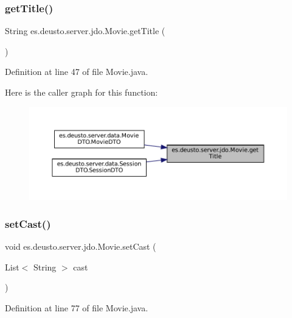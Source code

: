 \subsubsection{\texorpdfstring{getTitle()}{getTitle()}}
{\footnotesize\ttfamily String es.\+deusto.\+server.\+jdo.\+Movie.\+get\+Title (\begin{DoxyParamCaption}{ }\end{DoxyParamCaption})}



Definition at line 47 of file Movie.\+java.

Here is the caller graph for this function\+:\nopagebreak
\begin{figure}[H]
\begin{center}
\leavevmode
\includegraphics[width=350pt]{classes_1_1deusto_1_1server_1_1jdo_1_1_movie_aa69d66c8aa0135b6ae9b809cf0692389_icgraph}
\end{center}
\end{figure}
\mbox{\label{classes_1_1deusto_1_1server_1_1jdo_1_1_movie_aab7fa1af2944677769c47300ea061e3b}} 
\subsubsection{\texorpdfstring{setCast()}{setCast()}}
{\footnotesize\ttfamily void es.\+deusto.\+server.\+jdo.\+Movie.\+set\+Cast (\begin{DoxyParamCaption}\item[{List$<$ String $>$}]{cast }\end{DoxyParamCaption})}



Definition at line 77 of file Movie.\+java.

